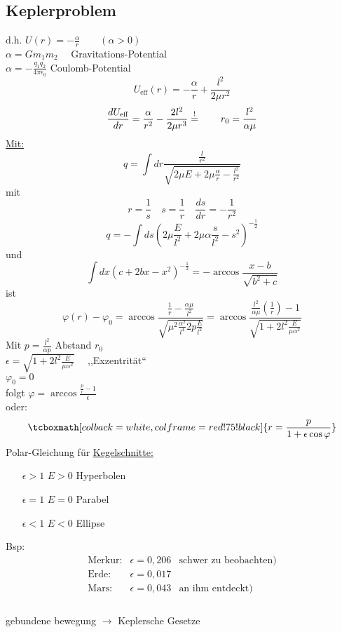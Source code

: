 \documentclass[titlepage,12pt,a4paper,ngerman]{report}
\newcommand{\tx}[1]{\textrm{#1}}
\newcommand{\rmbox}[1]{\tcboxmath[colback=white,colframe=red!75!black]{#1}} %
\renewcommand{\boxed}{\rmbox}
\begin{document}
\subsection{Keplerproblem}
d.h. $U(r) = - \frac{\alpha}{r} \qquad (\alpha > 0)$\\
$ \alpha = G m_1 m_2 \quad  $  Gravitations-Potential\\
$ \alpha = - \frac{q_1 q_2}{4 \pi \epsilon_0} $ Coulomb-Potential\\
$$U_{\tx{eff}} (r) = -\frac{\alpha}{r} + \frac{l^2}{2 \mu r^2} $$
$$\frac{d U_{\tx{eff}}}{dr} = \frac{\alpha}{r^2} - \frac{2 l^2}{2 \mu r^3} \buildrel ! \over = \qquad r_0 = \frac{l^2}{\alpha \mu}$$
\underline{Mit:}
$$q = \int dr \frac{\frac{l}{r^2}}{\sqrt{2 \mu E + 2 \mu \frac{\alpha}{r} - \frac{l^2}{r^2}}}$$
mit
$$ r = \frac{1}{s} \quad s = \frac{1}{r} \quad \frac{ds}{dr} = - \frac{1}{r^2}$$
$$ q = - \int ds (2\mu \frac{E}{l^2} + 2 \mu \alpha \frac{s}{l^2} - s^2) ^{-\frac{1}{2}}$$
und 
$$ \int dx (c+2bx-x^2)^{-\frac{1}{2}} = - \arccos \frac{x-b}{\sqrt{b^2 + c}}$$
ist
$$ \varphi(r) - \varphi_0 = \arccos \frac{\frac{1}{r} - \frac{\alpha \mu}{l^2}}{\sqrt{\mu^2 \frac{\alpha^2}{l^4} 2 p \frac{E}{l^2}}} = \arccos \frac{\frac{l^2}{\alpha \mu} (\frac{1}{r}) - 1}{\sqrt{1+2l^2 \frac{E}{\mu \alpha^2}}}$$
Mit $ p = \frac{l^2}{\alpha p} $ Abstand $ r_0 $\\
$ \epsilon = \sqrt{1 + 2l^2 \frac{E}{\mu \alpha^2}} \quad$ ,,Exzentrität``\\
$ \varphi_0 = 0 $\\
folgt $  \varphi = \arccos\frac{\frac{p}{r}-1}{\epsilon} $\\
oder:
$$\boxed{ r = \frac{p}{1 + \epsilon \cos \varphi}}$$
Polar-Gleichung für \underline{Kegelschnitte:}
\begin{itemize}
	\item[$ \epsilon > 1 $] $ E>0 $ Hyperbolen
	\item[$ \epsilon = 1 $] $ E = 0 $ Parabel
	\item[$ \epsilon < 1 $] $ E<0 $ Ellipse
\end{itemize}
Bsp:
$$\begin{array}{lll}
\tx{Merkur:} &  \epsilon = 0,206  & \tx{schwer zu beobachten)}\\
\tx{Erde:} & \epsilon = 0,017 \\
\tx{Mars:} & \epsilon = 0,043 & \tx{an ihm entdeckt)}\\
\end{array}$$\\
gebundene bewegung $ \rightarrow $ Keplersche Gesetze
\end{document}
